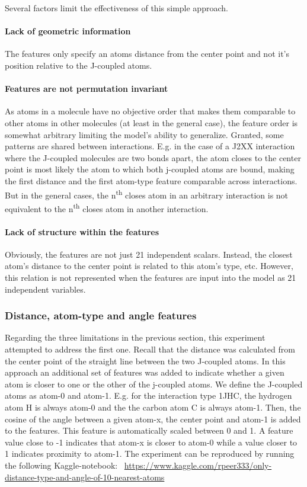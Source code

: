 Several factors limit the effectiveness of this simple approach.

\paragraph{Lack of geometric information} The features only specify an atoms distance from the center point and not it's position relative to the J-coupled atoms.

\paragraph{Features are not permutation invariant} As atoms in a molecule have no objective order that makes them comparable to other atoms in other molecules (at least in the general case), the feature order is somewhat arbitrary limiting the model's ability to generalize. Granted, some patterns are shared between interactions. E.g. in the case of a J2XX interaction where the J-coupled molecules are two bonds apart, the atom closes to the center point is most likely the atom to which both j-coupled atoms are bound, making the first distance and the first atom-type feature comparable across interactions. But in the general cases, the n\textsuperscript{th} closes atom in an arbitrary interaction is not equivalent to the n\textsuperscript{th} closes atom in another interaction.

\paragraph{Lack of structure within the features} Obviously, the features are not just 21 independent scalars. Instead, the closest atom's distance to the center point is related to this atom's type, etc. However, this relation is not represented when the features are input into the model as 21 independent variables.


\subsubsection{Distance, atom-type and angle features}
\label{sec:dist-angle-atom-type}

Regarding the three limitations in the previous section, this experiment attempted to address the first one. Recall that the distance was calculated from the center point of the straight line between the two J-coupled atoms. In this approach an additional set of features was added to indicate whether a given atom is closer to one or the other of the j-coupled atoms. We define the J-coupled atoms as atom-0 and atom-1. E.g. for the interaction type 1JHC, the hydrogen atom H is always atom-0 and the the carbon atom C is always atom-1. Then, the cosine of the angle between a given atom-x, the center point and atom-1 is added to the features. This feature is automatically scaled between 0 and 1. A feature value close to -1 indicates that atom-x is closer to atom-0 while a value closer to 1 indicates proximity to atom-1. The experiment can be reproduced by running the following Kaggle-notebook:~ \url{https://www.kaggle.com/rpeer333/only-distance-type-and-angle-of-10-nearest-atoms}

